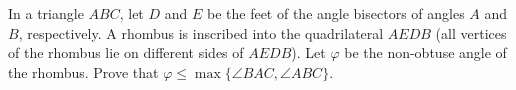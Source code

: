 In a triangle $ABC$, let $D$ and $E$ be the feet of the angle bisectors of angles $A$ and $B$, respectively. A rhombus is inscribed into the quadrilateral $AEDB$ (all vertices of the rhombus lie on different sides of $AEDB$). Let $\varphi$ be the non-obtuse angle of the rhombus. Prove that $\varphi \leq \max\{\angle BAC, \angle ABC\}$.
